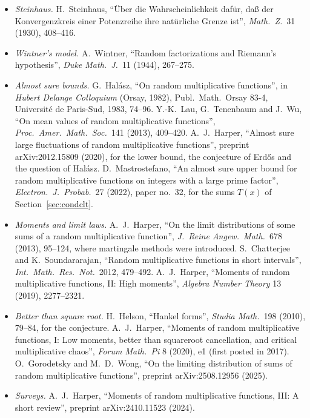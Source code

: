 \begin{itemize}
\item \emph{Steinhaus.} H.~Steinhaus, ``Über die Wahrscheinlichkeit dafür, daß der Konvergenzkreis einer Potenzreihe ihre natürliche Grenze ist'', \emph{Math.\ Z.}\ 31 (1930), 408--416.
\item \emph{Wintner's model.} A.~Wintner, ``Random factorizations and Riemann's hypothesis'', \emph{Duke Math.\ J.}\ 11 (1944), 267--275.
\item \emph{Almost sure bounds.} G.~Halász, ``On random multiplicative functions'', in \emph{Hubert Delange Colloquium} (Orsay, 1982), Publ.\ Math.\ Orsay 83-4, Université de Paris-Sud, 1983, 74--96. Y.-K.~Lau, G.~Tenenbaum and J.~Wu, ``On mean values of random multiplicative functions'', \emph{Proc.\ Amer.\ Math.\ Soc.}\ 141 (2013), 409--420. A.~J.~Harper, ``Almost sure large fluctuations of random multiplicative functions'', preprint arXiv:2012.15809 (2020), for the lower bound, the conjecture of Erd\H{o}s and the question of Halász. D.~Mastrostefano, ``An almost sure upper bound for random multiplicative functions on integers with a large prime factor'', \emph{Electron.\ J.\ Probab.}\ 27 (2022), paper no.~32, for the sums $T(x)$ of Section~\ref{sec:condclt}.
\item \emph{Moments and limit laws.} A.~J.~Harper, ``On the limit distributions of some sums of a random multiplicative function'', \emph{J.\ Reine Angew.\ Math.}\ 678 (2013), 95--124, where martingale methods were introduced. S.~Chatterjee and K.~Soundararajan, ``Random multiplicative functions in short intervals'', \emph{Int.\ Math.\ Res.\ Not.}\ 2012, 479--492. A.~J.~Harper, ``Moments of random multiplicative functions, II: High moments'', \emph{Algebra Number Theory} 13 (2019), 2277--2321.
\item \emph{Better than square root.} H.~Helson, ``Hankel forms'', \emph{Studia Math.}\ 198 (2010), 79--84, for the conjecture. A.~J.~Harper, ``Moments of random multiplicative functions, I: Low moments, better than squareroot cancellation, and critical multiplicative chaos'', \emph{Forum Math.\ Pi} 8 (2020), e1 (first posted in 2017). O.~Gorodetsky and M.~D.~Wong, ``On the limiting distribution of sums of random multiplicative functions'', preprint arXiv:2508.12956 (2025).
\item \emph{Surveys.} A.~J.~Harper, ``Moments of random multiplicative functions, III: A short review'', preprint arXiv:2410.11523 (2024).
\end{itemize}
